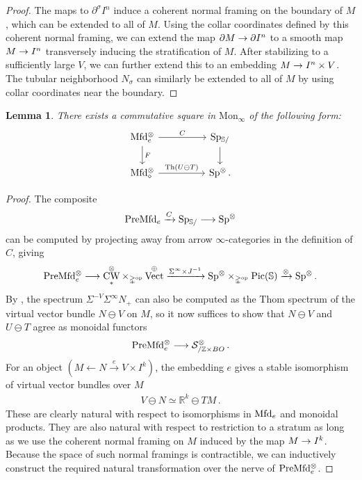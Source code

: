 \documentclass[10pt]{amsart}
\numberwithin{equation}{section}
\newtheorem{lem}[prop]{Lemma}
\theoremstyle{definition}
\DeclareMathOperator{\Pic}{Pic}
\DeclareMathOperator{\Th}{Th}
\DeclareMathOperator{\op}{op}
\DeclareMathOperator{\Vect}{Vect}
\DeclareMathOperator{\CW}{CW}
\newcommand{\Mfd}{\mathrm{Mfd}\vphantom{d}}
\newcommand{\PreMfd}{\mathrm{PreMfd}\vphantom{d}}
\newcommand{\bS}{\mathbb{S}}
\newcommand{\bZ}{\mathbb{Z}}
\newcommand{\bR}{\mathbb{R}}
\newcommand{\Simp}{\mathbb{\Delta}}
\newcommand{\cS}{\mathcal{S}}
\newcommand{\Mon}{\mathrm{Mon}_{\infty}}
\newcommand{\Sp}{\mathrm{Sp}\vphantom{p}}
\newcommand{\del}{\partial}
\renewcommand{\to}{\mathchoice{\longrightarrow}{\rightarrow}{}{}}
\begin{document}
\begin{proof}
	The maps to $\del^{\sigma}I^{n}$ induce a coherent normal framing on the boundary of $M$, which can be extended to all of $M$.
  Using the collar coordinates defined by this coherent normal framing, we can extend the map $\del M \to \del I^{n}$ to a smooth map $M\to I^{n}$ transversely inducing the stratification of $M$.
  After stabilizing to a sufficiently large $V$, we can further extend this to an embedding $M\to I^{n}\times V$.
  The tubular neighborhood $N_{\sigma}$ can similarly be extended to all of $M$ by using collar coordinates near the boundary.
\end{proof}


\begin{lem}\label{lem:collapse_commutes}
	There exists a commutative square in $\Mon$ of the following form:
	\begin{equation*}
		\begin{tikzcd}[column sep= huge]
			\Mfd_{e}^{\otimes} \arrow[r, "C" ] \arrow[d, "F"] & \Sp_{\bS/} \arrow[d] \\
			\Mfd_{\diamond}^{\otimes} \arrow[r, "\Th(U\ominus T)"] & \Sp^{\otimes} \,.
		\end{tikzcd}
	\end{equation*}
\end{lem}
\begin{proof}
	The composite
	\begin{align*}
		\PreMfd_{e} \xrightarrow{C} \Sp_{\bS/} \to \Sp^{\otimes}
	\end{align*}
	can be computed by projecting away from arrow $\infty$-categories in the definition of $C$, giving
	\begin{align*}
		\PreMfd_{e}^{\otimes} \to \CW_{\ast}^{\otimes}\times_{\Simp^{\op}} \Vect^{\oplus} \xrightarrow{\Sigma^{\infty} \times J^{-1}} \Sp^{\otimes} \times_{\Simp^{\op}} \Pic(\bS) \xrightarrow{\otimes} \Sp^{\otimes} \,.
	\end{align*}
	By , the spectrum $\Sigma^{-V}\Sigma^{\infty}N_{+}$ can also be computed as the Thom spectrum of the virtual vector bundle $N\ominus V$ on $M$, so it now suffices to show that $N\ominus V$ and $U\ominus T$ agree as monoidal functors
	\begin{align*}
		\PreMfd_{e}^{\otimes} \to \cS_{/\bZ\times BO}^{\otimes} \,.
	\end{align*}
	For an object $(M\leftarrow N \xrightarrow{e} V\times I^{k})$, the embedding $e$ gives a stable isomorphism of virtual vector bundles over $M$
	\begin{align*}
		V \ominus N \simeq \bR^{k} \ominus TM \,.
	\end{align*}
	These are clearly natural with respect to isomorphisms in $\Mfd_{e}$ and monoidal products.
  They are also natural with respect to restriction to a stratum as long as we use the coherent normal framing on $M$ induced by the map $M\to I^{k}$.
  Because the space of such normal framings is contractible, we can inductively construct the required natural transformation over the nerve of $\PreMfd_{e}^{\otimes}$.
\end{proof}
\end{document}
